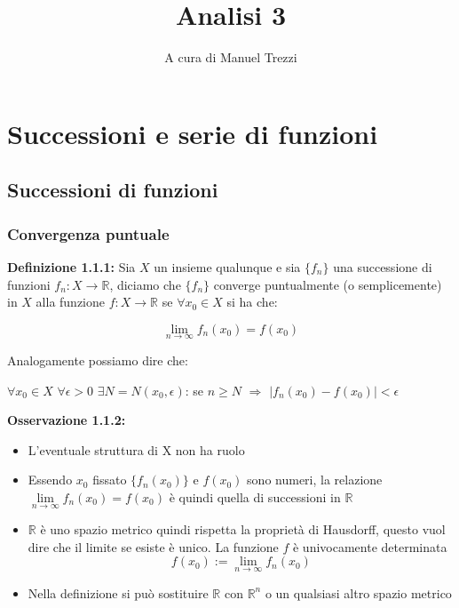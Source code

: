 \documentclass[a4paper,11pt,titlepage]{book}
\author{A cura di Manuel Trezzi}
\title{Analisi 3}
\begin{document}
\maketitle

\tableofcontents

\chapter{Successioni e serie di funzioni}

\section{Successioni di funzioni}

\subsection{Convergenza puntuale}

\textbf{Definizione 1.1.1:} Sia $X$ un insieme qualunque e sia $\{f_{n}\}$ una successione di funzioni $f_{n}:X\rightarrow\mathbb{R}$, diciamo che $\{f_{n}\}$ converge puntualmente (o semplicemente) in $X$ alla funzione $f:X\rightarrow\mathbb{R}$ se $\forall{x_{0}}\in{X}$ si ha che:\begin{center} \nointerlineskip \[\lim_{n \to \infty}{f_{n}(x_{0})}=f(x_{0})\]\end{center}Analogamente possiamo dire che:
\begin{center}
 $\forall{x_{0}}\in{X}$ $\forall{\epsilon{>0}}$ $\exists{N}=N(x_{0},\epsilon)$: se $n\geq{N}$ $\Rightarrow$ $|f_{n}(x_{0})-f(x_{0})|<\epsilon$ \\
 \end{center} 
 

\textbf{Osservazione 1.1.2:} \begin{itemize}
\item L'eventuale struttura di X non ha ruolo
\item Essendo $x_0$ fissato $\{f_{n}(x_0)\}$ e $f(x_0)$ sono numeri, la relazione $\lim\limits_{n\to\infty}f_n(x_0)=f(x_0)$ è quindi quella di successioni in $\mathbb{R}$
\item $\mathbb{R}$ è uno spazio metrico quindi rispetta la proprietà di Hausdorff, questo vuol dire che il limite se esiste è unico. La funzione $f$ è univocamente determinata  $$f(x_{0}):=\lim_{n \to \infty}{f_{n}}(x_{0})$$
\item Nella definizione si può sostituire $\mathbb{R}$ con $\mathbb{R}^n$ o un qualsiasi altro spazio metrico
\end{itemize}
\end{document}
